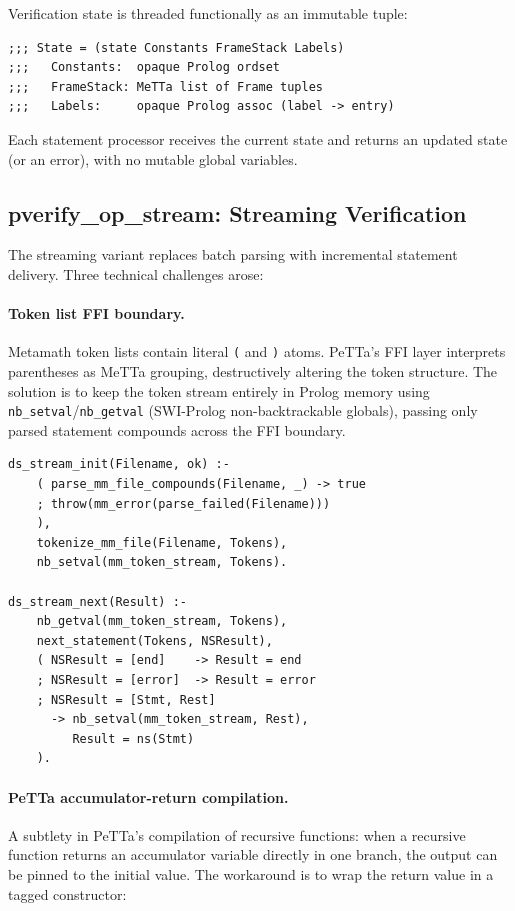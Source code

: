 \documentclass[11pt]{article}
\begin{document}
Verification state is threaded functionally as an immutable tuple:

\begin{lstlisting}[language=MeTTa,caption={State representation.}]
;;; State = (state Constants FrameStack Labels)
;;;   Constants:  opaque Prolog ordset
;;;   FrameStack: MeTTa list of Frame tuples
;;;   Labels:     opaque Prolog assoc (label -> entry)
\end{lstlisting}

Each statement processor receives the current state and returns
an updated state (or an error), with no mutable global variables.

\subsection{pverify\_op\_stream: Streaming Verification}

The streaming variant replaces batch parsing with incremental
statement delivery.  Three technical challenges arose:

\paragraph{Token list FFI boundary.}
Metamath token lists contain literal \texttt{(} and \texttt{)}
atoms.  PeTTa's FFI layer interprets parentheses as MeTTa grouping,
destructively altering the token structure.  The solution is to
keep the token stream entirely in Prolog memory using
\texttt{nb\_setval}/\texttt{nb\_getval} (SWI-Prolog non-backtrackable
globals), passing only parsed statement compounds across the FFI
boundary.

\begin{lstlisting}[language=SWIProlog,caption={Streaming helpers in pverify\_ds.pl.}]
ds_stream_init(Filename, ok) :-
    ( parse_mm_file_compounds(Filename, _) -> true
    ; throw(mm_error(parse_failed(Filename)))
    ),
    tokenize_mm_file(Filename, Tokens),
    nb_setval(mm_token_stream, Tokens).

ds_stream_next(Result) :-
    nb_getval(mm_token_stream, Tokens),
    next_statement(Tokens, NSResult),
    ( NSResult = [end]    -> Result = end
    ; NSResult = [error]  -> Result = error
    ; NSResult = [Stmt, Rest]
      -> nb_setval(mm_token_stream, Rest),
         Result = ns(Stmt)
    ).
\end{lstlisting}

\paragraph{PeTTa accumulator-return compilation.}
A subtlety in PeTTa's compilation of recursive functions: when
a recursive function returns an accumulator variable directly
in one branch, the output can be pinned to the initial value.
The workaround is to wrap the return value in a tagged constructor:
\end{document}
